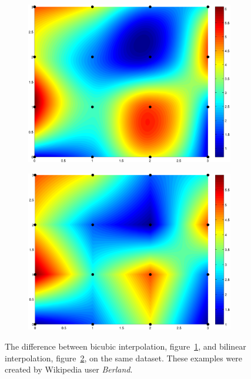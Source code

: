             \begin{figure}[H]
                \centering
                \begin{subfigure}{.5\textwidth}
                    \centering
                    \includegraphics[width=0.9\linewidth]{./images/Bicubic_Interpolation_Example.png}
                    \caption{}
                    \label{fig:example_bicubic}
                \end{subfigure}%
                \begin{subfigure}{.5\textwidth}
                    \includegraphics[width=0.9\linewidth]{./images/Bilinear_Interpolation_Example.png}
                    \caption{}
                    \label{fig:example_bilinear}
                \end{subfigure}
                \caption{The difference between bicubic interpolation, figure~\ref{fig:example_bicubic}, and bilinear interpolation, figure~\ref{fig:example_bilinear}, on the same dataset. These examples were created by Wikipedia user \emph{Berland}.}
                \label{fig:bicubic_vs_bilinear}
            \end{figure}


